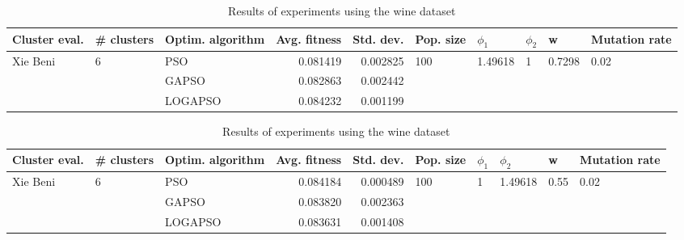 \documentclass{article}
\begin{document}
\begin{table}
\centering
\caption{Results of experiments using the wine dataset}
\begin{tabular}{lllrrlllll}
\toprule
            Cluster eval. &        \# clusters & Optim. algorithm &  Avg. fitness &  Std. dev. &            Pop. size &               $\phi_{1}$ &         $\phi_{2}$ &                       w &         Mutation rate \\
\midrule
\multirow{3}{*}{Xie Beni} & \multirow{3}{*}{6} &              PSO &      0.081419 &   0.002825 & \multirow{3}{*}{100} & \multirow{3}{*}{1.49618} & \multirow{3}{*}{1} & \multirow{3}{*}{0.7298} & \multirow{3}{*}{0.02} \\
                          &                    &            GAPSO &      0.082863 &   0.002442 &                      &                          &                    &                         &                       \\
                          &                    &          LOGAPSO &      0.084232 &   0.001199 &                      &                          &                    &                         &                       \\
\bottomrule
\end{tabular}
\end{table}
\begin{table}
\centering
\caption{Results of experiments using the wine dataset}
\begin{tabular}{lllrrlllll}
\toprule
            Cluster eval. &        \# clusters & Optim. algorithm &  Avg. fitness &  Std. dev. &            Pop. size &         $\phi_{1}$ &               $\phi_{2}$ &                     w &         Mutation rate \\
\midrule
\multirow{3}{*}{Xie Beni} & \multirow{3}{*}{6} &              PSO &      0.084184 &   0.000489 & \multirow{3}{*}{100} & \multirow{3}{*}{1} & \multirow{3}{*}{1.49618} & \multirow{3}{*}{0.55} & \multirow{3}{*}{0.02} \\
                          &                    &            GAPSO &      0.083820 &   0.002363 &                      &                    &                          &                       &                       \\
                          &                    &          LOGAPSO &      0.083631 &   0.001408 &                      &                    &                          &                       &                       \\
\bottomrule
\end{tabular}
\end{table}
\end{document}
